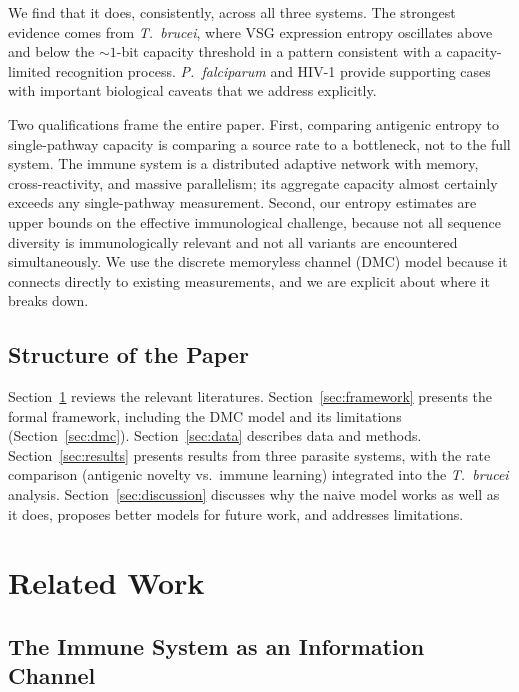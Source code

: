 \documentclass[twocolumn,10pt]{article}
\begin{document}
We find that it does, consistently, across all three systems.  The strongest evidence comes from \textit{T.~brucei}, where VSG expression entropy oscillates above and below the ${\sim}1$-bit capacity threshold in a pattern consistent with a capacity-limited recognition process.  \textit{P.~falciparum} and HIV-1 provide supporting cases with important biological caveats that we address explicitly.

Two qualifications frame the entire paper.  First, comparing antigenic entropy to single-pathway capacity is comparing a source rate to a bottleneck, not to the full system.  The immune system is a distributed adaptive network with memory, cross-reactivity, and massive parallelism; its aggregate capacity almost certainly exceeds any single-pathway measurement.  Second, our entropy estimates are upper bounds on the effective immunological challenge, because not all sequence diversity is immunologically relevant and not all variants are encountered simultaneously.  We use the discrete memoryless channel (DMC) model because it connects directly to existing measurements, and we are explicit about where it breaks down.

\subsection{Structure of the Paper}

Section~\ref{sec:related} reviews the relevant literatures.  Section~\ref{sec:framework} presents the formal framework, including the DMC model and its limitations (Section~\ref{sec:dmc}).  Section~\ref{sec:data} describes data and methods.  Section~\ref{sec:results} presents results from three parasite systems, with the rate comparison (antigenic novelty vs.\ immune learning) integrated into the \textit{T.~brucei} analysis.  Section~\ref{sec:discussion} discusses why the naive model works as well as it does, proposes better models for future work, and addresses limitations.

\section{Related Work}
\label{sec:related}

\subsection{The Immune System as an Information Channel}
\end{document}
